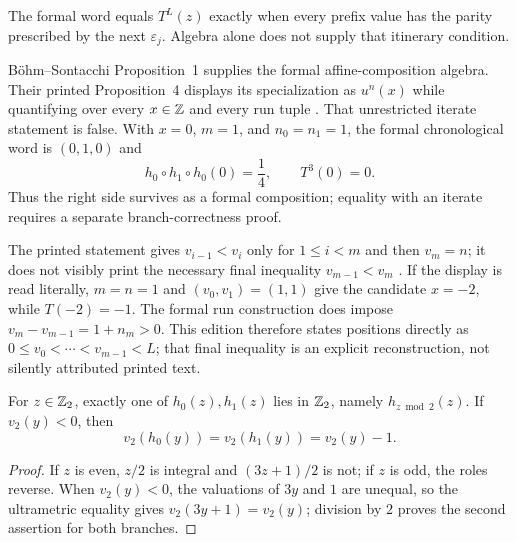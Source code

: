 The formal word equals $T^L(z)$ exactly when every prefix value has the parity
prescribed by the next $\varepsilon_j$.  Algebra alone does not supply that
itinerary condition.

\begin{sourceissue}
\label{sourceissue:BS-prop4}
B\"ohm--Sontacchi Proposition~1 supplies the formal affine-composition
algebra.  Their printed Proposition~4 displays its specialization as $u^n(x)$
while quantifying over every $x\in\mathbb{Z}$ and every run tuple
\cite[printed p.~263, Props.~1 and~4]{BohmSontacchi1978}.  That unrestricted
iterate statement is false.  With $x=0$, $m=1$, and $n_0=n_1=1$, the formal
chronological word is $(0,1,0)$ and
\[
 h_0\circ h_1\circ h_0(0)=\frac14,
 \qquad
 T^3(0)=0.
\]
Thus the right side survives as a formal composition; equality with an
iterate requires a separate branch-correctness proof.
\end{sourceissue}

\begin{sourceissue}
\label{sourceissue:BS-prop5}
The printed statement gives $v_{i-1}<v_i$ only for $1\leq i<m$ and then
$v_m=n$; it does not visibly print the necessary final inequality
$v_{m-1}<v_m$ \cite[printed p.~263, Prop.~5]{BohmSontacchi1978}.  If the
display is read literally, $m=n=1$ and $(v_0,v_1)=(1,1)$ give the candidate
$x=-2$, while $T(-2)=-1$.  The formal run construction does impose
$v_m-v_{m-1}=1+n_m>0$.  This edition therefore states positions directly as
$0\leq v_0<\cdots<v_{m-1}<L$; that final inequality is an explicit
reconstruction, not silently attributed printed text.
\end{sourceissue}

\begin{lemma}
\label{lem:wrong-branch}
For $z\in\mathbb{Z}_{2}$, exactly one of $h_0(z),h_1(z)$ lies in $\mathbb{Z}_{2}$, namely
$h_{z\bmod2}(z)$.  If $v_2(y)<0$, then
\[
 v_2(h_0(y))=v_2(h_1(y))=v_2(y)-1.
\]
\end{lemma}

\begin{proof}
If $z$ is even, $z/2$ is integral and $(3z+1)/2$ is not; if $z$ is odd, the
roles reverse.  When $v_2(y)<0$, the valuations of $3y$ and $1$ are unequal,
so the ultrametric equality gives $v_2(3y+1)=v_2(y)$; division by $2$ proves
the second assertion for both branches.
\end{proof}

